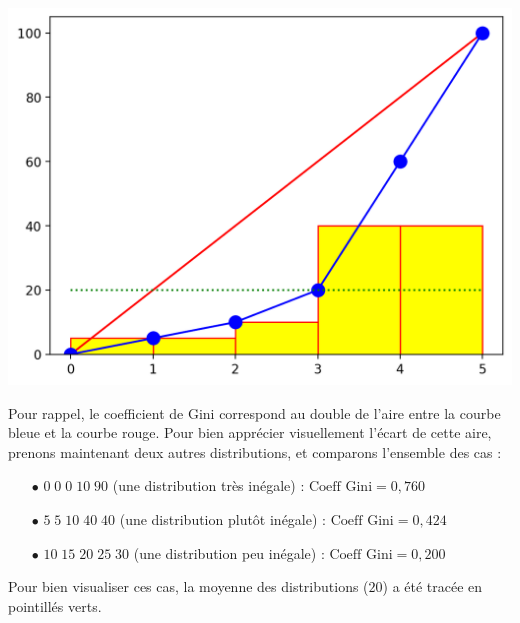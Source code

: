 \bigskip

\begin{center}
\includegraphics[scale=0.60]{images/exemple_courbe_lorenz-5-5-10-40-40.png}
\end{center}

\bigskip

\noindent Pour rappel, le coefficient de Gini correspond au double de l'aire entre la courbe bleue et la courbe rouge.
Pour bien apprécier visuellement l'écart de cette aire, prenons maintenant deux autres distributions, et comparons l'ensemble des cas :

\begin{itemize}
\item[$\bullet$] $ 0 \; 0 \; 0 \; 10 \; 90 $ (une distribution très inégale) : $ \text{Coeff Gini} = 0,760 $
\item[$\bullet$] $ 5 \; 5 \; 10 \; 40 \; 40 $ (une distribution plutôt inégale) : $ \text{Coeff Gini} = 0,424 $
\item[$\bullet$] $ 10 \; 15 \; 20 \; 25 \; 30 $ (une distribution peu inégale) : $ \text{Coeff Gini} = 0,200 $
\end{itemize}

\bigskip

\noindent Pour bien visualiser ces cas, la moyenne des distributions ($ 20 $) a été tracée en pointillés verts.

